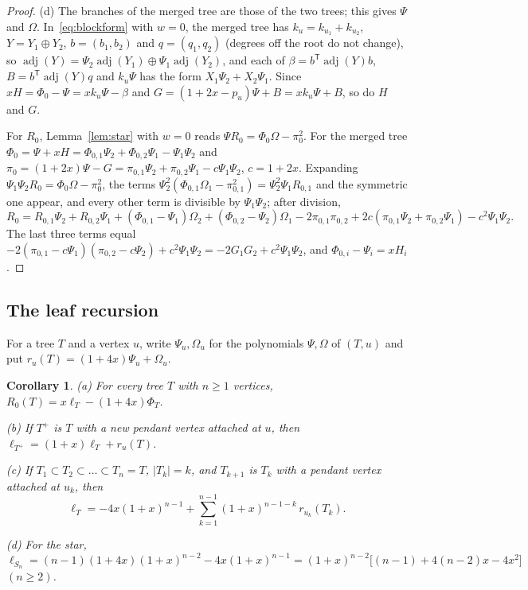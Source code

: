 \documentclass[11pt]{amsart}
\newtheorem{corollary}[theorem]{Corollary}
\theoremstyle{definition}
\theoremstyle{remark}
\newcommand{\adj}{\operatorname{adj}}
\newcommand{\T}{\mathsf T}
\begin{document}
\begin{proof}
(d) The branches of the merged tree are those of the two trees; this gives
$\Psi$ and $\Omega$. In~\eqref{eq:blockform} with $w=0$, the merged tree has
$k_u=k_{u_1}+k_{u_2}$, $Y=Y_1\oplus Y_2$, $b=(b_1,b_2)$ and $q=(q_1,q_2)$
(degrees off the root do not change), so $\adj(Y)=\Psi_2\adj(Y_1)\oplus\Psi_1\adj(Y_2)$,
and each of $\beta=b^\T\adj(Y)b$, $B=b^\T\adj(Y)q$ and $k_u\Psi$ has the form
$X_1\Psi_2+X_2\Psi_1$. Since $xH=\Phi_0-\Psi=xk_u\Psi-\beta$ and
$G=(1+2x-p_u)\Psi+B=xk_u\Psi+B$, so do $H$ and $G$.

For $R_0$, Lemma~\ref{lem:star} with $w=0$ reads $\Psi R_0=\Phi_0\Omega-\pi_0^2$.
For the merged tree
$\Phi_0=\Psi+xH=\Phi_{0,1}\Psi_2+\Phi_{0,2}\Psi_1-\Psi_1\Psi_2$ and
$\pi_0=(1+2x)\Psi-G=\pi_{0,1}\Psi_2+\pi_{0,2}\Psi_1-c\Psi_1\Psi_2$, $c=1+2x$.
Expanding $\Psi_1\Psi_2R_0=\Phi_0\Omega-\pi_0^2$, the terms
$\Psi_2^2(\Phi_{0,1}\Omega_1-\pi_{0,1}^2)=\Psi_2^2\Psi_1R_{0,1}$ and the
symmetric one appear, and every other term is divisible by $\Psi_1\Psi_2$;
after division,
\[
R_0=R_{0,1}\Psi_2+R_{0,2}\Psi_1+(\Phi_{0,1}-\Psi_1)\Omega_2+(\Phi_{0,2}-\Psi_2)\Omega_1
-2\pi_{0,1}\pi_{0,2}+2c(\pi_{0,1}\Psi_2+\pi_{0,2}\Psi_1)-c^2\Psi_1\Psi_2 .
\]
The last three terms equal $-2(\pi_{0,1}-c\Psi_1)(\pi_{0,2}-c\Psi_2)+c^2\Psi_1\Psi_2=-2G_1G_2+c^2\Psi_1\Psi_2$,
and $\Phi_{0,i}-\Psi_i=xH_i$.
\end{proof}

\subsection{The leaf recursion}

For a tree $T$ and a vertex $u$, write $\Psi_u,\Omega_u$ for the polynomials
$\Psi,\Omega$ of $(T,u)$ and put $r_u(T)=(1+4x)\Psi_u+\Omega_u$.

\begin{corollary}\label{cor:leaf}
\textup{(a)} For every tree $T$ with $n\ge1$ vertices,
$R_0(T)=x\ell_T-(1+4x)\Phi_T$.

\textup{(b)} If $T^+$ is $T$ with a new pendant vertex attached at $u$, then
$\ell_{T^+}=(1+x)\ell_T+r_u(T)$.

\textup{(c)} If $T_1\subset T_2\subset\dots\subset T_n=T$, $|T_k|=k$, and
$T_{k+1}$ is $T_k$ with a pendant vertex attached at $u_k$, then
\[
\ell_T=-4x(1+x)^{n-1}+\sum_{k=1}^{n-1}(1+x)^{n-1-k}\,r_{u_k}(T_k).
\]

\textup{(d)} For the star, $\ell_{S_n}=(n-1)(1+4x)(1+x)^{n-2}-4x(1+x)^{n-1}=(1+x)^{n-2}\bigl[(n-1)+4(n-2)x-4x^2\bigr]$ $(n\ge2)$.
\end{corollary}
\end{document}
